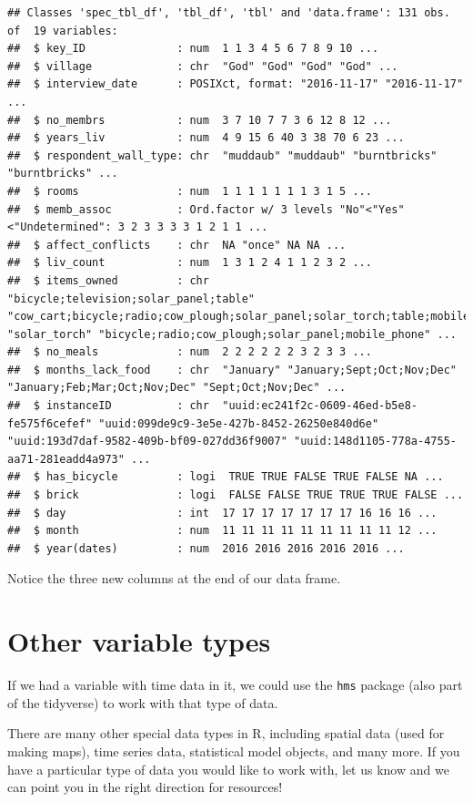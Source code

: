 \documentclass[]{book}
\begin{document}
\begin{verbatim}
## Classes 'spec_tbl_df', 'tbl_df', 'tbl' and 'data.frame': 131 obs. of  19 variables:
##  $ key_ID              : num  1 1 3 4 5 6 7 8 9 10 ...
##  $ village             : chr  "God" "God" "God" "God" ...
##  $ interview_date      : POSIXct, format: "2016-11-17" "2016-11-17" ...
##  $ no_membrs           : num  3 7 10 7 7 3 6 12 8 12 ...
##  $ years_liv           : num  4 9 15 6 40 3 38 70 6 23 ...
##  $ respondent_wall_type: chr  "muddaub" "muddaub" "burntbricks" "burntbricks" ...
##  $ rooms               : num  1 1 1 1 1 1 1 3 1 5 ...
##  $ memb_assoc          : Ord.factor w/ 3 levels "No"<"Yes"<"Undetermined": 3 2 3 3 3 3 1 2 1 1 ...
##  $ affect_conflicts    : chr  NA "once" NA NA ...
##  $ liv_count           : num  1 3 1 2 4 1 1 2 3 2 ...
##  $ items_owned         : chr  "bicycle;television;solar_panel;table" "cow_cart;bicycle;radio;cow_plough;solar_panel;solar_torch;table;mobile_phone" "solar_torch" "bicycle;radio;cow_plough;solar_panel;mobile_phone" ...
##  $ no_meals            : num  2 2 2 2 2 2 3 2 3 3 ...
##  $ months_lack_food    : chr  "January" "January;Sept;Oct;Nov;Dec" "January;Feb;Mar;Oct;Nov;Dec" "Sept;Oct;Nov;Dec" ...
##  $ instanceID          : chr  "uuid:ec241f2c-0609-46ed-b5e8-fe575f6cefef" "uuid:099de9c9-3e5e-427b-8452-26250e840d6e" "uuid:193d7daf-9582-409b-bf09-027dd36f9007" "uuid:148d1105-778a-4755-aa71-281eadd4a973" ...
##  $ has_bicycle         : logi  TRUE TRUE FALSE TRUE FALSE NA ...
##  $ brick               : logi  FALSE FALSE TRUE TRUE TRUE FALSE ...
##  $ day                 : int  17 17 17 17 17 17 17 16 16 16 ...
##  $ month               : num  11 11 11 11 11 11 11 11 11 12 ...
##  $ year(dates)         : num  2016 2016 2016 2016 2016 ...
\end{verbatim}

Notice the three new columns at the end of our data frame.

\section{Other variable types}\label{other-variable-types}

If we had a variable with time data in it, we could use the \texttt{hms}
package (also part of the tidyverse) to work with that type of data.

There are many other special data types in R, including spatial data
(used for making maps), time series data, statistical model objects, and
many more. If you have a particular type of data you would like to work
with, let us know and we can point you in the right direction for
resources!
\end{document}
